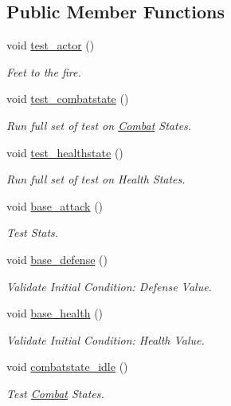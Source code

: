 \subsection*{Public Member Functions}
\begin{DoxyCompactItemize}
\item 
void \mbox{\hyperlink{classTestActors_a5b01d8e27e70d12bd2f373e22b8664cd}{test\+\_\+actor}} ()
\begin{DoxyCompactList}\small\item\em Feet to the fire. \end{DoxyCompactList}\item 
void \mbox{\hyperlink{classTestActors_ac601ed92d184d8a3a170f93235462d89}{test\+\_\+combatstate}} ()
\begin{DoxyCompactList}\small\item\em Run full set of test on \mbox{\hyperlink{classCombat}{Combat}} States. \end{DoxyCompactList}\item 
void \mbox{\hyperlink{classTestActors_a1dbd79e63638e20627e7ab62fb90fce6}{test\+\_\+healthstate}} ()
\begin{DoxyCompactList}\small\item\em Run full set of test on Health States. \end{DoxyCompactList}\item 
void \mbox{\hyperlink{classTestActors_a066d2adf19928b138d68d84401986dda}{base\+\_\+attack}} ()
\begin{DoxyCompactList}\small\item\em Test Stats. \end{DoxyCompactList}\item 
void \mbox{\hyperlink{classTestActors_aa3f64287c815f5d919e15a6434bba7de}{base\+\_\+defense}} ()
\begin{DoxyCompactList}\small\item\em Validate Initial Condition\+: Defense Value. \end{DoxyCompactList}\item 
void \mbox{\hyperlink{classTestActors_a07a000bd17d45007304a026a5f33780d}{base\+\_\+health}} ()
\begin{DoxyCompactList}\small\item\em Validate Initial Condition\+: Health Value. \end{DoxyCompactList}\item 
void \mbox{\hyperlink{classTestActors_ad91ee71834205bddf98130928c7477db}{combatstate\+\_\+idle}} ()
\begin{DoxyCompactList}\small\item\em Test \mbox{\hyperlink{classCombat}{Combat}} States. \end{DoxyCompactList}\item 

\end{DoxyCompactItemize}
